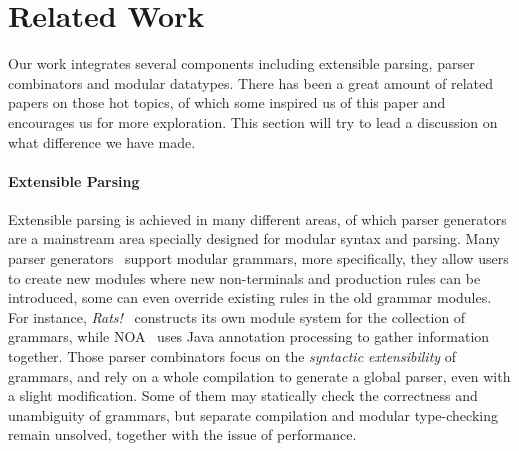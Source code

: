 \section{Related Work}\label{sec:relatedwork}

%
%
%
%

Our work integrates several components including extensible parsing, parser combinators and modular datatypes. There has been a great amount of related papers
on those hot topics, of which some inspired us of this paper and encourages us for more exploration. This section will try to lead a discussion on what difference we have made.

\paragraph*{Extensible Parsing} Extensible parsing is achieved in many different areas, of which parser generators are a mainstream area specially designed for modular syntax and parsing. Many parser generators~\cite{antlr1995,Grimm2006,Gouseti2014,Warth2016} support modular grammars, more specifically, they allow users to create new modules where new non-terminals and production rules can be introduced, some can even override existing rules in the old grammar modules. For instance, \textit{Rats!}~\cite{Grimm2006}
constructs its own module system for the collection of grammars, while NOA~\cite{Gouseti2014} uses Java annotation processing to gather information together. Those parser combinators focus on the \textit{syntactic extensibility} of grammars, and rely on a whole compilation to generate a global parser, even with a slight modification. Some of them may statically check the correctness and unambiguity of grammars, but separate compilation and modular type-checking remain unsolved, together with the issue of performance.


